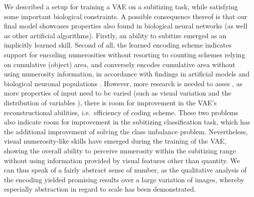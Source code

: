 \documentclass[twocolumn]{article}
\begin{document}
We described a setup for training a VAE on a subitizing task, while
satisfying some important biological constraints. A possible consequence
thereof is that our final model showcases properties also found in
biological neural networks (as well as other artificial algorithms).
Firstly, an ability to subitize emerged as an implicitly learned skill.
Second of all, the learned encoding scheme indicates support for
encoding numerosities without resorting to counting schemes relying on
cumulative (object) area, and conversely encodes cumulative area
without using numerosity information, in accordance with findings in artificial models \citep{stoianov2012} and biological neuronal populations \citep{harvey2013topographic, nieder2016neuronal}. However,
more research is needed to asses , as more properties of input need to
be varied (such as visual variation and the distribution of variables ),
there is room for improvement in the VAE's reconstructional abilities,
i.e.~efficiency of coding scheme. These two problems also indicate room
for improvement in the subitizing classification task, which has the
additional improvement of solving the class imbalance problem.
Nevertheless, visual numerosity-like skills have emerged during the
training of the VAE, showing the overall ability to perceive numerosity
within the subitizing range without using information provided by visual
features other than quantity. We can thus speak of a fairly abstract
sense of number, as the qualitative analysis of the encoding yielded
promising results over a large variation of images, whereby especially
abstraction in regard to scale has been demonstrated.


\end{document}
